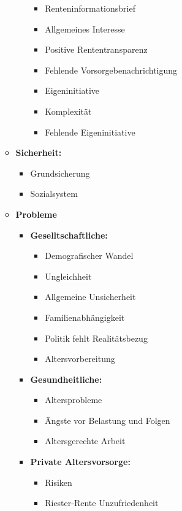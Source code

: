 \documentclass{hsflensburg}
\begin{document}
\begin{itemize}
\begin{itemize}
\begin{itemize}
	\begin{itemize}
	\item Renteninformationsbrief
	\item Allgemeines Interesse
	\item Positive Rententransparenz
	\item Fehlende Vorsorgebenachrichtigung
	\item Eigeninitiative
	\item Komplexität
	\item Fehlende Eigeninitiative
	\end{itemize}

	\end{itemize}

	\item \textbf{Sicherheit:}
	\begin{itemize}
	\item Grundsicherung
	\item Sozialsystem
	\end{itemize}

	\item \textbf{Probleme}
	\begin{itemize}

	\item \textbf{Geselltschaftliche:}
	\begin{itemize}
	\item Demografischer Wandel
	\item Ungleichheit
	\item Allgemeine Unsicherheit
	\item Familienabhängigkeit
	\item Politik fehlt Realitätsbezug
	\item Altersvorbereitung
	\end{itemize}

	\item \textbf{Gesundheitliche:}
	\begin{itemize}
	\item Altersprobleme
	\item Ängste vor Belastung und Folgen
	\item Altersgerechte Arbeit
	\end{itemize}

	\item \textbf{Private Altersvorsorge:}
	\begin{itemize}
	\item Risiken
	\item Riester-Rente Unzufriedenheit
	\end{itemize}


\end{itemize}
\end{itemize}
\end{itemize}
\end{document}
